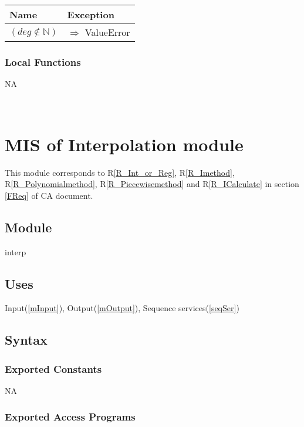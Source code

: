 \documentclass[12pt, titlepage]{article}
\begin{document}
\begin{tabular}{p{12cm} p{4.75cm}}
	
	\toprule
	\textbf{Name}&\textbf{Exception}\\
	\midrule
	
	
	$ (deg \notin \mathbb{N})$ & $\Longrightarrow$ ValueError\\

	
	\bottomrule
\end{tabular}


\subsubsection{Local Functions}

NA




~\newpage

\section{MIS of Interpolation module} \label{mInterp}

This module corresponds to R\ref{R_Int_or_Reg}, R\ref{R_Imethod}, 
R\ref{R_Polynomialmethod}, R\ref{R_Piecewisemethod} and R\ref{R_ICalculate}
in section \ref{FReq} of CA document.


\subsection{Module}

interp

\subsection{Uses}

Input(\ref{mInput}), Output(\ref{mOutput}), Sequence services(\ref{seqSer})


\subsection{Syntax}

\subsubsection{Exported Constants}


NA

\subsubsection{Exported Access Programs}
\end{document}
